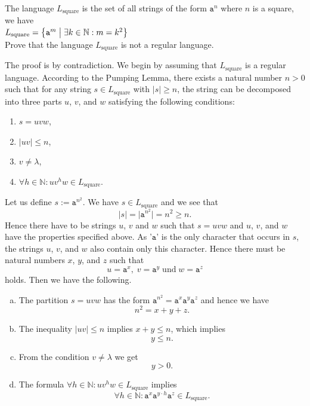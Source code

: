 \exerciseEng
The language  $L_{\mathrm{square}}$ is the set of all strings of the form $\mathtt{a}^n$ where $n$
is a square, we have
\\[0.2cm]
\hspace*{1.3cm}
$L_{\mathrm{square}} = \bigl\{ \mathtt{a}^{m} \bigm| \exists k \in \mathbb{N}: m = k^2 \bigr\}$
\\[0.2cm]
Prove that the language  $L_{\mathrm{square}}$ is not a regular language.
\eox
\vspace*{0.1cm}

\solutionEng
The proof is by contradiction. We begin by assuming that $L_{\mathrm{square}}$ is a regular
language. According to the Pumping Lemma, there exists a natural number $n > 0$ such that for any string
$s \in L_{\mathrm{square}}$ with $|s| \geq n$, the string can be decomposed into three parts $u$, $v$, and $w$ 
satisfying the following conditions:  
\begin{enumerate}
\item $s = uvw$,
\item $|uv| \leq n$,
\item $v \not= \lambda$,
\item $\forall h \in \mathbb{N}: uv^hw \in L_{\mathrm{square}}$. 
\end{enumerate} 
Let us define $s := \mathtt{a}^{n^2}$.  We have $s \in L_{\mathrm{square}}$ and we see that
\[ |s| = \big| \mathtt{a}^{n^2} \big| = n^2 \geq n. \]
Hence there have to be strings $u$, $v$ and $w$ such that $s = uvw$ and $u$, $v$, and $w$ have
the properties specified above.
As '$\mathtt{a}$' is the only character that occurs in $s$, the strings $u$, $v$, and $w$ also contain only this character.
Hence there must be natural numbers $x$, $y$, and $z$ such that 
\[ u = \mathtt{a}^x,\; v = \mathtt{a}^y\; \mbox{und}\; w = \mathtt{a}^z \]
holds.  Then we have the following.
\begin{enumerate}[(a)]
\item The partition  $s = uvw$ has the form $\mathtt{a}^{n^2} = \mathtt{a}^x\mathtt{a}^y\mathtt{a}^z$ and hence we have
      \begin{equation}
        \label{eq:e1}
         n^2 = x + y + z.     
      \end{equation}
\item The inequality $|uv| \leq n$ implies $x +y \leq n$, which implies
      \begin{equation}
        \label{eq:e2}
        y \leq n.
      \end{equation}
\item From the condition $v \not= \lambda$ we get
      \begin{equation}
        \label{eq:e3}
        y > 0.
      \end{equation}
\item The formula $\forall h \in \mathbb{N}: uv^hw \in L_{\mathrm{square}}$ implies
      \begin{equation}
        \label{eq:e4}
        \forall h \in \mathbb{N}: \mathtt{a}^x\mathtt{a}^{y\cdot h}\mathtt{a}^z \in L_{\mathrm{square}}. 
      \end{equation}
\end{enumerate}
